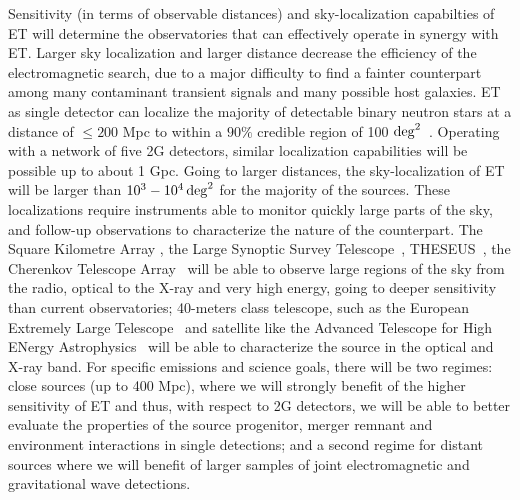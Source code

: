 Sensitivity (in terms of observable distances) and sky-localization capabilties of ET will determine the observatories that can effectively
operate in synergy with ET. Larger sky localization and larger distance decrease the efficiency of the electromagnetic search, due to a major difficulty to find a fainter counterpart among many contaminant transient signals and many possible host galaxies. ET as single detector can localize the majority of detectable binary neutron stars at a distance of $\leq 200$ Mpc to within a $90\%$ credible region of 100 ${\rm deg}^2$~\cite{Zhao:2017cbb,Chan2018}.  Operating with a network of five 2G detectors, similar localization capabilities will be possible up to about 1 Gpc. Going to larger distances,  the sky-localization of ET will be larger than $10^3-10^4 \,{\rm deg}^2$ for the majority of the sources. These localizations require instruments able to monitor quickly large parts of the sky,  and follow-up observations to characterize the nature of the counterpart. The Square Kilometre Array \cite[SKA,][]{Carilli2004}, the Large Synoptic Survey Telescope~\citep[LSST,][]{Ivezic2008}, THESEUS~\citep[mission concept,][]{Amati:2017npy}, the Cherenkov Telescope Array~\citep[CTA,][]{Acharya2013} will be able to observe large regions of the sky from the radio, optical to the X-ray and very high energy, going to deeper sensitivity than current observatories; 40-meters class telescope, such as the European Extremely Large Telescope~\citep[E-ELT][]{Clenet2013} and satellite like the Advanced Telescope for High ENergy Astrophysics~\citep[ATHENA,][]{Nandra2013} will be able to characterize the source in the optical and X-ray band. 
For specific emissions and science goals, there will be two regimes: close sources (up to 400 Mpc), where we will strongly benefit of the higher sensitivity of ET and thus, with respect to 2G detectors, we will be  able to better evaluate the properties of the source progenitor, merger remnant and environment interactions in single detections;  and a second regime for distant sources where we will benefit of larger samples of joint electromagnetic and gravitational wave detections.


